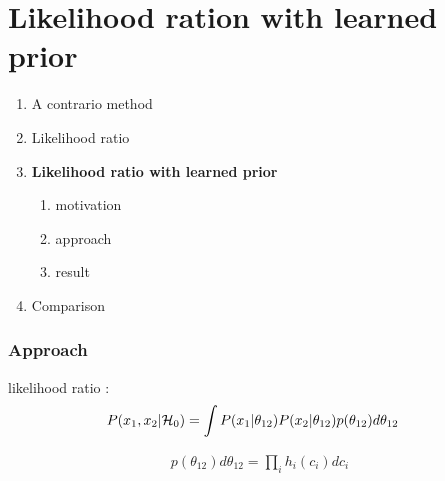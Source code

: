 \documentclass[compress]{beamer} %
\begin{document}
 \section{Likelihood ration with learned prior}
 \begin{frame}
 \scriptsize
 {
 \begin{enumerate}


  \item A contrario method
  \item Likelihood ratio
  \item \textbf{Likelihood ratio with learned prior}
  \begin{enumerate}
   \item motivation
   \item approach
   \item result
  \end{enumerate}

  \item Comparison
  
 \end{enumerate}

  
 }
 \end{frame} 
 
 \begin{frame}
  \frametitle{Approach}
  likelihood ratio :
  \[
  \begin{split}
   P(x_1,x_2 \arrowvert \mathcal{H}_0)&=\int P(x_1 \arrowvert \theta_{12}) P(x_2 \arrowvert \theta_{12}) p(\theta_{12}) d\theta_{12}
  \end{split}
  \]
  
  \[
  \begin{split}
   p(\theta_{12}) d\theta_{12}=\prod_i h_i(c_i)dc_i
  \end{split}
  \]
 \end{frame}
\end{document}
